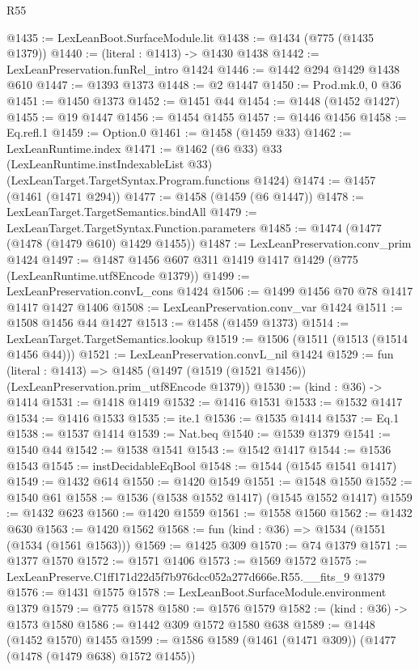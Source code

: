\begin{lexlean}{R55}
\begin{coremodule}
{{@1435 := LexLeanBoot.SurfaceModule.lit
@1438 := @1434 (@775 (@1435 @1379))
@1440 := (literal : @1413) -> @1430 @1438
@1442 := LexLeanPreservation.funRel_intro @1424
@1446 := @1442 @294 @1429 @1438 @610
@1447 := @1393 @1373
@1448 := @2 @1447
@1450 := Prod.mk.{0, 0} @36
@1451 := @1450 @1373
@1452 := @1451 @44
@1454 := @1448 (@1452 @1427)
@1455 := @19 @1447
@1456 := @1454 @1455
@1457 := @1446 @1456
@1458 := Eq.refl.{1}
@1459 := Option.{0}
@1461 := @1458 (@1459 @33)
@1462 := LexLeanRuntime.index
@1471 := @1462
    (@6 @33)
    @33
    (LexLeanRuntime.instIndexableList @33)
    (LexLeanTarget.TargetSyntax.Program.functions @1424)
@1474 := @1457 (@1461 (@1471 @294))
@1477 := @1458 (@1459 (@6 @1447))
@1478 := LexLeanTarget.TargetSemantics.bindAll
@1479 := LexLeanTarget.TargetSyntax.Function.parameters
@1485 := @1474 (@1477 (@1478 (@1479 @610) @1429 @1455))
@1487 := LexLeanPreservation.conv_prim @1424
@1497 := @1487 @1456 @607 @311 @1419 @1417 @1429 (@775 (LexLeanRuntime.utf8Encode @1379))
@1499 := LexLeanPreservation.convL_cons @1424
@1506 := @1499 @1456 @70 @78 @1417 @1417 @1427 @1406
@1508 := LexLeanPreservation.conv_var @1424
@1511 := @1508 @1456 @44 @1427
@1513 := @1458 (@1459 @1373)
@1514 := LexLeanTarget.TargetSemantics.lookup
@1519 := @1506 (@1511 (@1513 (@1514 @1456 @44)))
@1521 := LexLeanPreservation.convL_nil @1424
@1529 := fun (literal : @1413) =>
  @1485 (@1497 (@1519 (@1521 @1456)) (LexLeanPreservation.prim_utf8Encode @1379))
@1530 := (kind : @36) -> @1414
@1531 := @1418 @1419
@1532 := @1416 @1531
@1533 := @1532 @1417
@1534 := @1416 @1533
@1535 := ite.{1}
@1536 := @1535 @1414
@1537 := Eq.{1}
@1538 := @1537 @1414
@1539 := Nat.beq
@1540 := @1539 @1379
@1541 := @1540 @44
@1542 := @1538 @1541
@1543 := @1542 @1417
@1544 := @1536 @1543
@1545 := instDecidableEqBool
@1548 := @1544 (@1545 @1541 @1417)
@1549 := @1432 @614
@1550 := @1420 @1549
@1551 := @1548 @1550
@1552 := @1540 @61
@1558 := @1536 (@1538 @1552 @1417) (@1545 @1552 @1417)
@1559 := @1432 @623
@1560 := @1420 @1559
@1561 := @1558 @1560
@1562 := @1432 @630
@1563 := @1420 @1562
@1568 := fun (kind : @36) => @1534 (@1551 (@1534 (@1561 @1563)))
@1569 := @1425 @309
@1570 := @74 @1379
@1571 := @1377 @1570
@1572 := @1571 @1406
@1573 := @1569 @1572
@1575 := LexLeanPreserve.C1ff171d22d5f7b976dcc052a277d666e.R55.__fits_9 @1379
@1576 := @1431 @1575
@1578 := LexLeanBoot.SurfaceModule.environment @1379
@1579 := @775 @1578
@1580 := @1576 @1579
@1582 := (kind : @36) -> @1573 @1580
@1586 := @1442 @309 @1572 @1580 @638
@1589 := @1448 (@1452 @1570) @1455
@1599 := @1586 @1589 (@1461 (@1471 @309)) (@1477 (@1478 (@1479 @638) @1572 @1455))
}}
\end{coremodule}
\end{lexlean}
